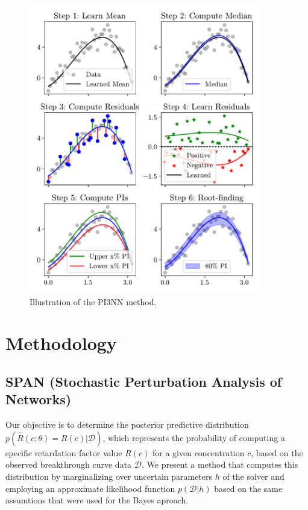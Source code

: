 \begin{figure}
    \centering
    \includegraphics[width=0.9\textwidth]{figs/3pinn_illustration.pdf}
    \caption{Illustration of the PI3NN method.}
    \label{fig:3pinn_illustration}
\end{figure}





\section{Methodology}
\subsection{SPAN (Stochastic Perturbation Analysis of Networks)}
Our objective is to determine the posterior predictive distribution $p(\hat{R}(c; \theta) = R(c)| \mathcal{D})$, which represents the probability of computing a specific retardation factor value $R(c)$ for a given concentration $c$, based on the observed breakthrough curve data $\mathcal{D}$. We present a method that computes this distribution by marginalizing over uncertain parameters $h$ of the solver and employing an approximate likelihood function $p(\mathcal{D} | h)$ based on the same assumtions that were used for the Bayes aproach.

